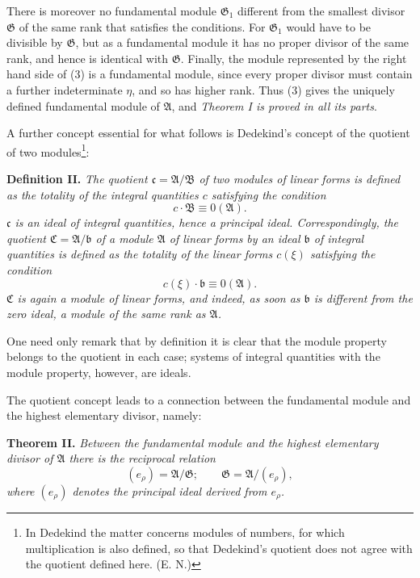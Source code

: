 \documentclass[11pt]{article}
\providecommand{\Amod}{\mathfrak A}
\providecommand{\Bmod}{\mathfrak B}
\providecommand{\Gmod}{\mathfrak G}
\providecommand{\bb}{\mathfrak b}
\providecommand{\cc}{\mathfrak c}
\providecommand{\zero}[1]{\equiv 0(#1)}
\providecommand{\Amod}{\mathfrak A}
\providecommand{\Bmod}{\mathfrak B}
\providecommand{\Gmod}{\mathfrak G}
\providecommand{\zero}[1]{\equiv 0\pmod{#1}}
\providecommand{\bb}{\overline{\mathfrak{b}}}
\begin{document}
There is moreover no fundamental module $\Gmod_1$ different from the smallest divisor $\Gmod$ of the same rank that satisfies the conditions. For $\Gmod_1$ would have to be divisible by $\Gmod$, but as a fundamental module it has no proper divisor of the same rank, and hence is identical with $\Gmod$. Finally, the module represented by the right hand side of (3) is a fundamental module, since every proper divisor must contain a further indeterminate $\eta$, and so has higher rank. Thus (3) gives the uniquely defined fundamental module of $\Amod$, and \emph{Theorem I is proved in all its parts}.

A further concept essential for what follows is Dedekind's concept of the quotient of two modules\footnote{In Dedekind the matter concerns modules of numbers, for which multiplication is also defined, so that Dedekind's quotient does not agree with the quotient defined here. (E. N.)}:

\medskip
\noindent\textbf{Definition II.} \emph{The quotient $\cc=\Amod/\Bmod$ of two modules of linear forms is defined as the totality of the integral quantities $c$ satisfying the condition}
\[
 c\cdot\Bmod\zero{\Amod}.
\]
\emph{$\cc$ is an ideal of integral quantities, hence a principal ideal. Correspondingly, the quotient $\mathfrak C=\Amod/\bb$ of a module $\Amod$ of linear forms by an ideal $\bb$ of integral quantities is defined as the totality of the linear forms $c(\xi)$ satisfying the condition}
\[
 c(\xi)\cdot\bb\zero{\Amod}.
\]
\emph{$\mathfrak C$ is again a module of linear forms, and indeed, as soon as $\bb$ is different from the zero ideal, a module of the same rank as $\Amod$.}

One need only remark that by definition it is clear that the module property belongs to the quotient in each case; systems of integral quantities with the module property, however, are ideals.

The quotient concept leads to a connection between the fundamental module and the highest elementary divisor, namely:

\medskip
\noindent\textbf{Theorem II.} \emph{Between the fundamental module and the highest elementary divisor of $\Amod$ there is the reciprocal relation}
\begin{equation}
 (e_\rho)=\Amod/\Gmod;\qquad \Gmod=\Amod/(e_\rho),
\tag{5}
\end{equation}
\emph{where $(e_\rho)$ denotes the principal ideal derived from $e_\rho$.}
\end{document}
